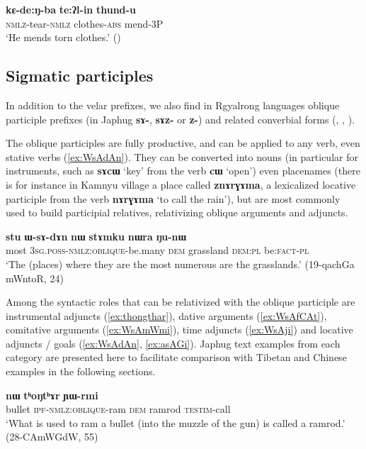 \documentclass[oneside,a4paper,11pt]{article}
\newcommand{\ipa}[1]{\textbf{{\phon\mbox{#1}}}} %
\begin{document}
\begin{exe}
\ex \label{ex:kEdengba}
 \gll \ipa{kɛ-de:ŋ-ba} \ipa{te:ʔl-in} \ipa{thund-u} \\
 \textsc{nmlz}-tear-\textsc{nmlz} clothes-\textsc{abs} mend-3P \\
 \glt `He mends torn clothes.' (\citealt[201]{driem87})
\end{exe}

\subsection{Sigmatic participles} \label{sec:rgyalrong.sigmatic}
In addition to the velar prefixes, we also find in Rgyalrong languages oblique participle prefixes (in Japhug \ipa{sɤ-}, \ipa{sɤz-} or \ipa{z-}) and related converbial forms (\citealt{yanmuchu05sa}, \citealt{jackson14morpho}, \citealt{jacques16relatives}).


The oblique participles are fully productive, and can be applied to any verb, even stative verbs (\ref{ex:WsAdAn}). They can be converted into nouns (in particular for instruments, such as \ipa{sɤcɯ} `key' from the verb \ipa{cɯ} `open') even placenames (there is for instance in Kamnyu village a place called \ipa{znɤrɣɤma}, a lexicalized locative participle from the verb \ipa{nɤrɣɤma} `to call the rain'), but are most commonly used to build participial relatives, relativizing oblique arguments and adjuncts.

\begin{exe}
\ex \label{ex:WsAdAn}
\gll \ipa{stu} 	\ipa{ɯ-sɤ-dɤn} 	\ipa{nɯ} 	\ipa{stɤmku} 	\ipa{nɯra} 	\ipa{ŋu-nɯ}  \\
most \textsc{3sg}.\textsc{poss}-\textsc{nmlz}:\textsc{oblique}-be.many \textsc{dem} grassland \textsc{dem}:\textsc{pl} be:\textsc{fact}-\textsc{pl} \\
\glt `The (places) where they are the most numerous are the grasslands.' (19-qachGa mWntoR, 24)
\end{exe}

Among the syntactic roles that can be relativized with the oblique participle are instrumental adjuncts (\ref{ex:thongthar}), dative arguments (\ref{ex:WsAfCAt}), comitative arguments (\ref{ex:WsAmWmi}), time adjuncts (\ref{ex:WsAji}) and locative adjuncts / goals (\ref{ex:WsAdAn}, \ref{ex:asAGi}). Japhug text examples from each category are presented here to facilitate comparison with Tibetan and Chinese examples in the following sections.

 \begin{exe}
\ex \label{ex:thongthar}
\gll [\ipa{qandʑi}   	\ipa{cʰɯ-sɤ-ɣnda}]   	\ipa{nɯ}   	\ipa{tʰoŋtʰɤr}   	  	\ipa{ɲɯ-rmi}    \\
bullet \textsc{ipf}-\textsc{nmlz:oblique}-ram   \textsc{dem} ramrod \textsc{testim}-call \\
 \glt `What is used to ram a bullet (into the muzzle of the gun) is called a ramrod.' (28-CAmWGdW, 55)
 \end{exe}
 
\end{document}
